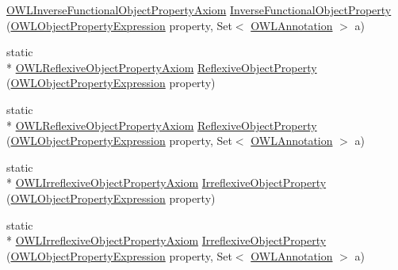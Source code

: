 \begin{DoxyCompactItemize}
\hyperlink{interfaceorg_1_1semanticweb_1_1owlapi_1_1model_1_1_o_w_l_inverse_functional_object_property_axiom}{O\-W\-L\-Inverse\-Functional\-Object\-Property\-Axiom} \hyperlink{classorg_1_1semanticweb_1_1owlapi_1_1apibinding_1_1_o_w_l_functional_syntax_factory_ac77abfb1d7146f279f4d8c5e23defdcd}{Inverse\-Functional\-Object\-Property} (\hyperlink{interfaceorg_1_1semanticweb_1_1owlapi_1_1model_1_1_o_w_l_object_property_expression}{O\-W\-L\-Object\-Property\-Expression} property, Set$<$ \hyperlink{interfaceorg_1_1semanticweb_1_1owlapi_1_1model_1_1_o_w_l_annotation}{O\-W\-L\-Annotation} $>$ a)
\item 
static \\*
\hyperlink{interfaceorg_1_1semanticweb_1_1owlapi_1_1model_1_1_o_w_l_reflexive_object_property_axiom}{O\-W\-L\-Reflexive\-Object\-Property\-Axiom} \hyperlink{classorg_1_1semanticweb_1_1owlapi_1_1apibinding_1_1_o_w_l_functional_syntax_factory_a35d36fdd24162f1a2339e7fef0a8603c}{Reflexive\-Object\-Property} (\hyperlink{interfaceorg_1_1semanticweb_1_1owlapi_1_1model_1_1_o_w_l_object_property_expression}{O\-W\-L\-Object\-Property\-Expression} property)
\item 
static \\*
\hyperlink{interfaceorg_1_1semanticweb_1_1owlapi_1_1model_1_1_o_w_l_reflexive_object_property_axiom}{O\-W\-L\-Reflexive\-Object\-Property\-Axiom} \hyperlink{classorg_1_1semanticweb_1_1owlapi_1_1apibinding_1_1_o_w_l_functional_syntax_factory_a1114955e5634598e8c398d9b4ea8d298}{Reflexive\-Object\-Property} (\hyperlink{interfaceorg_1_1semanticweb_1_1owlapi_1_1model_1_1_o_w_l_object_property_expression}{O\-W\-L\-Object\-Property\-Expression} property, Set$<$ \hyperlink{interfaceorg_1_1semanticweb_1_1owlapi_1_1model_1_1_o_w_l_annotation}{O\-W\-L\-Annotation} $>$ a)
\item 
static \\*
\hyperlink{interfaceorg_1_1semanticweb_1_1owlapi_1_1model_1_1_o_w_l_irreflexive_object_property_axiom}{O\-W\-L\-Irreflexive\-Object\-Property\-Axiom} \hyperlink{classorg_1_1semanticweb_1_1owlapi_1_1apibinding_1_1_o_w_l_functional_syntax_factory_ae4b7b74dc4c4670d8453eb6b8bbbde64}{Irreflexive\-Object\-Property} (\hyperlink{interfaceorg_1_1semanticweb_1_1owlapi_1_1model_1_1_o_w_l_object_property_expression}{O\-W\-L\-Object\-Property\-Expression} property)
\item 
static \\*
\hyperlink{interfaceorg_1_1semanticweb_1_1owlapi_1_1model_1_1_o_w_l_irreflexive_object_property_axiom}{O\-W\-L\-Irreflexive\-Object\-Property\-Axiom} \hyperlink{classorg_1_1semanticweb_1_1owlapi_1_1apibinding_1_1_o_w_l_functional_syntax_factory_a9186614f3f77eaa81719f19124f1508e}{Irreflexive\-Object\-Property} (\hyperlink{interfaceorg_1_1semanticweb_1_1owlapi_1_1model_1_1_o_w_l_object_property_expression}{O\-W\-L\-Object\-Property\-Expression} property, Set$<$ \hyperlink{interfaceorg_1_1semanticweb_1_1owlapi_1_1model_1_1_o_w_l_annotation}{O\-W\-L\-Annotation} $>$ a)

\end{DoxyCompactItemize}
